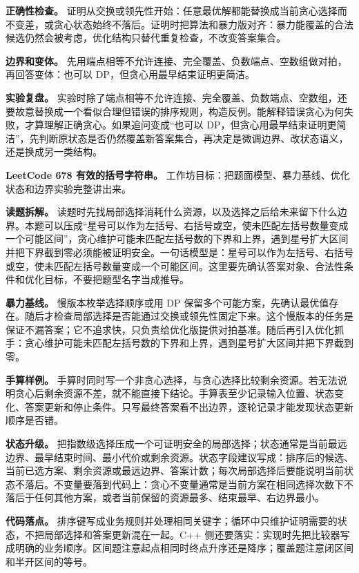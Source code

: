 \textbf{正确性检查。} 证明从交换或领先性开始：任意最优解都能替换成当前贪心选择而不变差，或贪心状态始终不落后。证明时把算法和暴力版对齐：暴力能覆盖的合法候选仍然会被考虑，优化结构只替代重复检查，不改变答案集合。

\textbf{边界和变体。} 先用端点相等不允许连接、完全覆盖、负数端点、空数组做对拍，再回答变体：也可以 DP，但贪心用最早结束证明更简洁。

\textbf{实验复盘。} 实验时除了端点相等不允许连接、完全覆盖、负数端点、空数组，还要故意替换成一个看似合理但错误的排序规则，构造反例。能解释错误贪心为何失败，才算理解正确贪心。如果追问变成“也可以 DP，但贪心用最早结束证明更简洁”，先判断原状态是否仍然覆盖新答案集合，再决定是微调边界、改状态语义，还是换成另一类结构。

\noindent\textbf{LeetCode 678 有效的括号字符串。} 工作坊目标：把题面模型、暴力基线、优化状态和边界实验完整讲出来。

\textbf{读题拆解。} 读题时先找局部选择消耗什么资源，以及选择之后给未来留下什么边界。本题可以压成“星号可以作为左括号、右括号或空，使未匹配左括号数量变成一个可能区间”，贪心维护可能未匹配左括号数的下界和上界，遇到星号扩大区间并把下界截到零必须能被证明安全。一句话模型是：星号可以作为左括号、右括号或空，使未匹配左括号数量变成一个可能区间。这里要先确认答案对象、合法性条件和优化目标，不要把题型名字当成推导。

\textbf{暴力基线。} 慢版本枚举选择顺序或用 DP 保留多个可能方案，先确认最优值存在。随后才检查局部选择是否能通过交换或领先性固定下来。这个慢版本的任务是保证不漏答案；它不追求快，只负责给优化版提供对拍基准。随后再引入优化抓手：贪心维护可能未匹配左括号数的下界和上界，遇到星号扩大区间并把下界截到零。

\textbf{手算样例。} 手算时同时写一个非贪心选择，与贪心选择比较剩余资源。若无法说明贪心后剩余资源不差，就不能直接下结论。手算表至少记录输入位置、状态变化、答案更新和停止条件。只写最终答案看不出边界，逐轮记录才能发现状态更新顺序是否错。

\textbf{状态升级。} 把指数级选择压成一个可证明安全的局部选择；状态通常是当前最远边界、最早结束时间、最小代价或剩余资源。状态字段建议写成：排序后的候选、当前已选方案、剩余资源或最远边界、答案计数；每次局部选择后要能说明当前状态不落后。不变量要落到代码上：贪心不变量通常是当前方案在相同选择次数下不落后于任何其他方案，或者当前保留的资源最多、结束最早、右边界最小。

\textbf{代码落点。} 排序键写成业务规则并处理相同关键字；循环中只维护证明需要的状态，不把局部选择和答案更新混在一起。C++ 侧还要落实：实现时先把比较器写成明确的业务顺序。区间题注意起点相同时终点升序还是降序；覆盖题注意闭区间和半开区间的等号。

